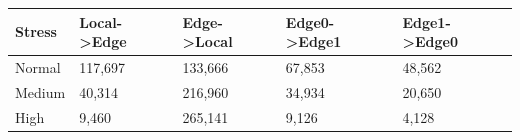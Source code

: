 \begin{tabular}{lllll}
\toprule
Stress & Local->Edge & Edge->Local & Edge0->Edge1 & Edge1->Edge0 \\
\midrule
Normal & 117,697 & 133,666 & 67,853 & 48,562 \\
Medium & 40,314 & 216,960 & 34,934 & 20,650 \\
High & 9,460 & 265,141 & 9,126 & 4,128 \\
\bottomrule
\end{tabular}
